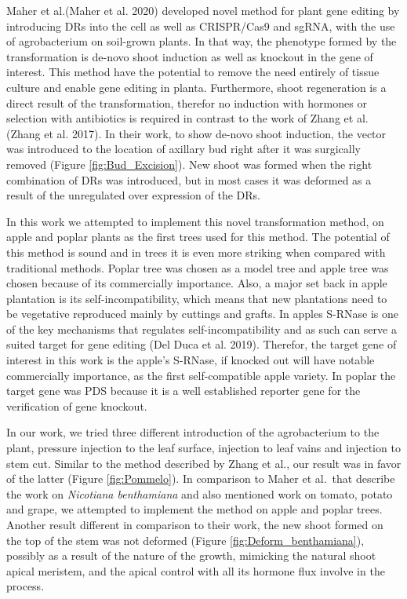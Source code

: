\documentclass[
]{article}
\begin{document}
Maher et al.(Maher et al. 2020) developed novel method for plant gene
editing by introducing DRs into the cell as well as CRISPR/Cas9 and
sgRNA, with the use of agrobacterium on soil-grown plants. In that way,
the phenotype formed by the transformation is de-novo shoot induction as
well as knockout in the gene of interest. This method have the potential
to remove the need entirely of tissue culture and enable gene editing in
planta. Furthermore, shoot regeneration is a direct result of the
transformation, therefor no induction with hormones or selection with
antibiotics is required in contrast to the work of Zhang et al.(Zhang et
al. 2017). In their work, to show de-novo shoot induction, the vector
was introduced to the location of axillary bud right after it was
surgically removed (Figure \ref{fig:Bud_Excision}). New shoot was formed
when the right combination of DRs was introduced, but in most cases it
was deformed as a result of the unregulated over expression of the DRs.

In this work we attempted to implement this novel transformation method,
on apple and poplar plants as the first trees used for this method. The
potential of this method is sound and in trees it is even more striking
when compared with traditional methods. Poplar tree was chosen as a
model tree and apple tree was chosen because of its commercially
importance. Also, a major set back in apple plantation is its
self-incompatibility, which means that new plantations need to be
vegetative reproduced mainly by cuttings and grafts. In apples S-RNase
is one of the key mechanisms that regulates self-incompatibility and as
such can serve a suited target for gene editing (Del Duca et al. 2019).
Therefor, the target gene of interest in this work is the apple's
S-RNase, if knocked out will have notable commercially importance, as
the first self-compatible apple variety. In poplar the target gene was
PDS because it is a well established reporter gene for the verification
of gene knockout.

In our work, we tried three different introduction of the agrobacterium
to the plant, pressure injection to the leaf surface, injection to leaf
vains and injection to stem cut. Similar to the method described by
Zhang et al., our result was in favor of the latter (Figure
\ref{fig:Pommelo}). In comparison to Maher et al.~that describe the work
on \emph{Nicotiana benthamiana} and also mentioned work on tomato,
potato and grape, we attempted to implement the method on apple and
poplar trees. Another result different in comparison to their work, the
new shoot formed on the top of the stem was not deformed (Figure
\ref{fig:Deform_benthamiana}), possibly as a result of the nature of the
growth, mimicking the natural shoot apical meristem, and the apical
control with all its hormone flux involve in the process.
\end{document}
